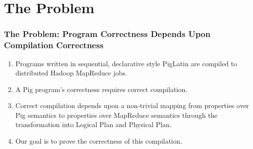 \section{The Problem}

\begin{frame}
  \frametitle{The Problem: Program Correctness Depends Upon Compilation
    Correctness}
  \begin{enumerate}
    \item Programs written in sequential, declarative style PigLatin are compiled to distributed Hadoop MapReduce jobs.
    \item A Pig program's correctness requires correct compilation.
    \item Correct compilation depends upon a non-trivial mapping from
      properties over Pig semantics to properties over MapReduce semantics through the transformation into Logical Plan and Physical Plan.
    \item Our goal is to prove the correctness of this compilation.
  \end{enumerate}
\end{frame}
